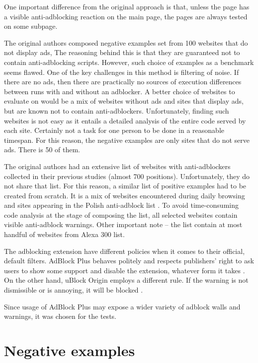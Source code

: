 One important difference from the original approach is that, unless the page has a visible anti-adblocking
reaction on the main page, the pages are always tested on some subpage.

The original authors composed negative examples set from 100 websites that do not display ads,
The reasoning behind this is that they are guaranteed not to contain anti-adblocking scripts.
However, such choice of examples as a benchmark seems flawed.
One of the key challenges in this method is filtering of noise. If there are no ads, 
then there are practically no sources of execution differences between runs with and without an adblocker.
A better choice of websites to evaluate on would be a mix of websites without ads and sites that
display ads, but are known not to contain anti-adblockers.
Unfortunately, finding such websites is not easy as it entails a detailed analysis of the entire code
served by each site. Certainly not a task for one person to be done in a reasonable timespan.
For this reason, the negative examples are only sites that do not serve ads. There is 50 of them.

The original authors had an extensive list of websites with anti-adblockers collected in their
previous studies (almost 700 positions). Unfortunately, they do not share that list. 
For this reason, a similar list of positive examples had to be created from scratch.
It is a mix of websites encountered during daily browsing and sites appearing in the
Polish anti-adblock list \cite{github:anti-adblock-list}.
To avoid time-consuming code analysis at the stage of composing the list, 
all selected websites contain visible anti-adblock warnings.
Other important note -- the list contain at most handful of websites from Alexa 300 list.

The adblocking extension have different policies when it comes to their official, default filters.
AdBlock Plus behaves politely and respects publishers' right to ask users to show some support
and disable the extension, whatever form it takes \cite{adblock:policy}.
On the other hand, uBlock Origin employs a different rule. If the warning is not dismissible or is annoying,
it will be blocked \cite{vice:ublock-policy}.

Since usage of AdBlock Plus may expose a wider variety of adblock walls and warnings, it was chosen for the tests.

\section{Negative examples}

